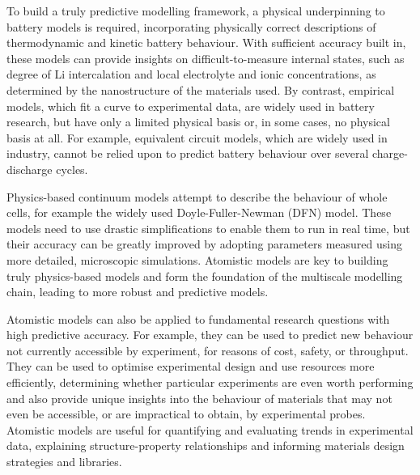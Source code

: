 \documentclass[../main.tex]{subfiles}
\begin{document}
To build a truly predictive modelling framework, a physical underpinning to battery models is required, incorporating physically correct descriptions of thermodynamic and kinetic battery behaviour. With sufficient accuracy built in, these models can provide insights on difficult-to-measure internal states, such as degree of Li intercalation and local electrolyte and ionic concentrations, as determined by the nanostructure of the materials used. By contrast, empirical models, which fit a curve to experimental data, are widely used in battery research, but have only a limited physical basis or, in some cases, no physical basis at all. For example, equivalent circuit models, which are widely used in industry, cannot be relied upon to predict battery behaviour over several charge-discharge cycles.

Physics-based continuum models attempt to describe the behaviour of whole cells, for example the widely used Doyle-Fuller-Newman (DFN) model. \cite{doyle1993modeling, fuller1994simulation, Fuller1994a,Doyle1995,Newman2004} These models need to use drastic simplifications to enable them to run in real time, but their accuracy can be greatly improved by adopting parameters measured using more detailed, microscopic simulations. Atomistic models are key to building truly physics-based models and form the foundation of the multiscale modelling chain, leading to more robust and predictive models.
 
Atomistic models can also be applied to fundamental research questions with high predictive accuracy. For example, they can be used to predict new behaviour not currently accessible by experiment, for reasons of cost, safety, or throughput. They can be used to optimise experimental design and use resources more efficiently, determining whether particular experiments are even worth performing and also provide unique insights into the behaviour of materials that may not even be accessible, or are impractical to obtain, by experimental probes. Atomistic models are useful for quantifying and evaluating trends in experimental data, explaining structure-property relationships and informing materials design strategies and libraries.
\end{document}
